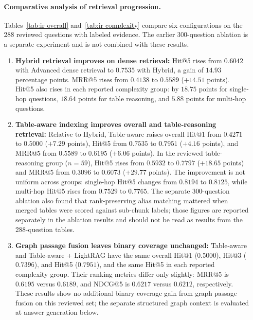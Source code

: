 \documentclass[sn-mathphys, oneside]{sn-jnl}
\begin{document}
\paragraph{Comparative analysis of retrieval progression.}
Tables~\ref{tab:ir-overall} and~\ref{tab:ir-complexity} compare six configurations on the 288 reviewed questions with labeled evidence. The earlier 300-question ablation is a separate experiment and is not combined with these results.
\begin{enumerate}
\item \textbf{Hybrid retrieval improves on dense retrieval:} Hit@5 rises from $0.6042$ with Advanced dense retrieval to $0.7535$ with Hybrid, a gain of $14.93$ percentage points. MRR@5 rises from $0.4138$ to $0.5589$ ($+14.51$ points). Hit@5 also rises in each reported complexity group: by $18.75$ points for single-hop questions, $18.64$ points for table reasoning, and $5.88$ points for multi-hop questions.
\item \textbf{Table-aware indexing improves overall and table-reasoning retrieval:} Relative to Hybrid, Table-aware raises overall Hit@1 from $0.4271$ to $0.5000$ ($+7.29$ points), Hit@5 from $0.7535$ to $0.7951$ ($+4.16$ points), and MRR@5 from $0.5589$ to $0.6195$ ($+6.06$ points). In the reviewed table-reasoning group ($n=59$), Hit@5 rises from $0.5932$ to $0.7797$ ($+18.65$ points) and MRR@5 from $0.3096$ to $0.6073$ ($+29.77$ points). The improvement is not uniform across groups: single-hop Hit@5 changes from $0.8194$ to $0.8125$, while multi-hop Hit@5 rises from $0.7529$ to $0.7765$. The separate 300-question ablation also found that rank-preserving alias matching mattered when merged tables were scored against sub-chunk labels; those figures are reported separately in the ablation results and should not be read as results from the 288-question tables.
\item \textbf{Graph passage fusion leaves binary coverage unchanged:} Table-aware and Table-aware + LightRAG have the same overall Hit@1 ($0.5000$), Hit@3 ($0.7396$), and Hit@5 ($0.7951$), and the same Hit@5 in each reported complexity group. Their ranking metrics differ only slightly: MRR@5 is $0.6195$ versus $0.6189$, and NDCG@5 is $0.6217$ versus $0.6212$, respectively. These results show no additional binary-coverage gain from graph passage fusion on this reviewed set; the separate structured graph context is evaluated at answer generation below.
\end{enumerate}
\end{document}
